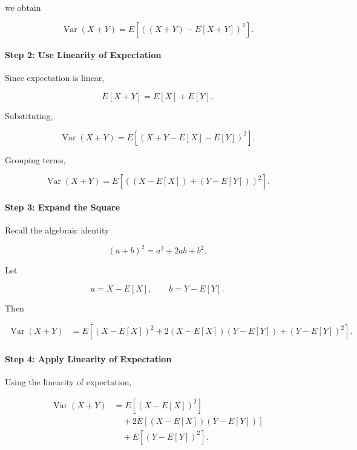 \documentclass[11pt]{article}
\begin{document}
\begin{mdframed}[
		linewidth=0.8pt,
		roundcorner=6pt,
		backgroundcolor=gray!5,
		linecolor=gray!60,
		innertopmargin=10pt,
		innerbottommargin=10pt,
		innerleftmargin=10pt,
		innerrightmargin=10pt
		]
		we obtain
		
		\[
		\operatorname{Var}(X+Y)
		=
		E\!\left[
		\left(
		(X+Y)-E[X+Y]
		\right)^2
		\right].
		\]
		
		\bigskip
		
		\paragraph{Step 2: Use Linearity of Expectation}
		
		Since expectation is linear,
		
		\[
		E[X+Y]
		=
		E[X]
		+
		E[Y].
		\]
		
		Substituting,
		
		\[
		\operatorname{Var}(X+Y)
		=
		E\!\left[
		\left(
		X+Y-E[X]-E[Y]
		\right)^2
		\right].
		\]
		
		Grouping terms,
		
		\[
		\operatorname{Var}(X+Y)
		=
		E\!\left[
		\left(
		(X-E[X])
		+
		(Y-E[Y])
		\right)^2
		\right].
		\]
		
		\bigskip
		
		\paragraph{Step 3: Expand the Square}
		
		Recall the algebraic identity
		
		\[
		(a+b)^2
		=
		a^2+2ab+b^2.
		\]
		
		Let
		
		\[
		a=X-E[X],
		\qquad
		b=Y-E[Y].
		\]
		
		Then
		
		\[
		\begin{aligned}
			\operatorname{Var}(X+Y)
			&=
			E\!\left[
			(X-E[X])^2
			+
			2(X-E[X])(Y-E[Y])
			+
			(Y-E[Y])^2
			\right].
		\end{aligned}
		\]
		
		\bigskip
		
		\paragraph{Step 4: Apply Linearity of Expectation}
		
		Using the linearity of expectation,
		
		\[
		\begin{aligned}
			\operatorname{Var}(X+Y)
			&=
			E[(X-E[X])^2]
			\\
			&\quad
			+
			2E[(X-E[X])(Y-E[Y])]
			\\
			&\quad
			+
			E[(Y-E[Y])^2].
		\end{aligned}
		\]
		

\end{mdframed}
\end{document}
